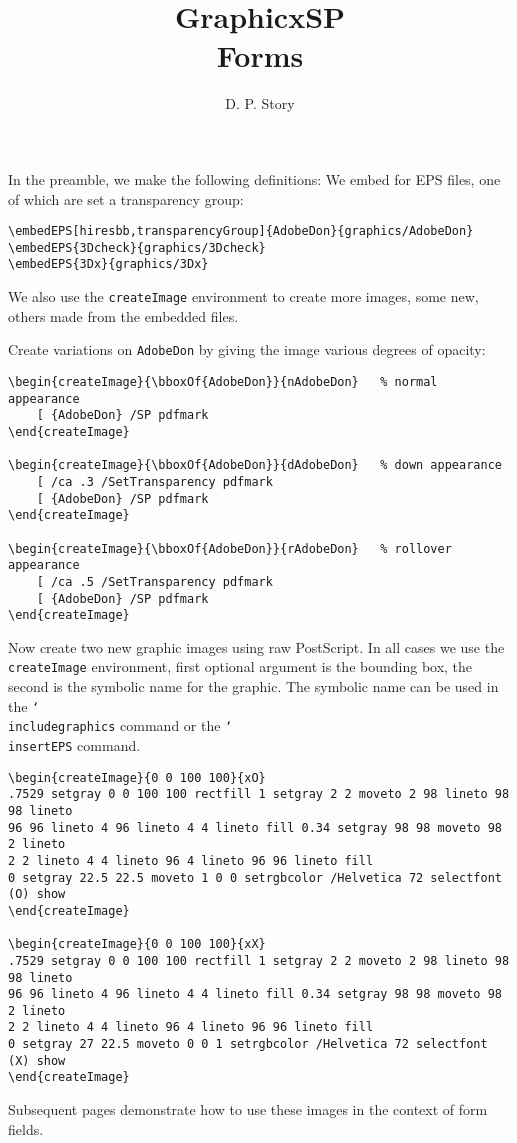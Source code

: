 \documentclass{article}
\title{\textsf{GraphicxSP}\texorpdfstring{\\}{:} Forms}
\author{D. P. Story}
\newcommand{\cs}[1]{\texttt{\char`\\#1}}
\begin{document}
\maketitle

In the preamble, we make the following definitions: We embed for EPS
files, one of which are set a transparency group:
{\small\begin{Verbatim}[fontsize=\small]
\embedEPS[hiresbb,transparencyGroup]{AdobeDon}{graphics/AdobeDon}
\embedEPS{3Dcheck}{graphics/3Dcheck}
\embedEPS{3Dx}{graphics/3Dx}
\end{Verbatim}
}
We also use the \texttt{createImage} environment to create more images, some new, others made
from the embedded files.\medskip

Create variations on \texttt{AdobeDon} by giving the image various degrees of opacity:
\begin{Verbatim}[fontsize=\scriptsize]
\begin{createImage}{\bboxOf{AdobeDon}}{nAdobeDon}   % normal appearance
    [ {AdobeDon} /SP pdfmark
\end{createImage}

\begin{createImage}{\bboxOf{AdobeDon}}{dAdobeDon}   % down appearance
    [ /ca .3 /SetTransparency pdfmark
    [ {AdobeDon} /SP pdfmark
\end{createImage}

\begin{createImage}{\bboxOf{AdobeDon}}{rAdobeDon}   % rollover appearance
    [ /ca .5 /SetTransparency pdfmark
    [ {AdobeDon} /SP pdfmark
\end{createImage}
\end{Verbatim}


\newpage

Now create two new graphic images using raw PostScript. In all cases we use
the \texttt{createImage} environment, first optional argument is the bounding box,
the second is the symbolic name for the graphic. The symbolic name can be used
in the \cs{includegraphics} command or the \cs{insertEPS} command.
\begin{Verbatim}[fontsize=\scriptsize]
\begin{createImage}{0 0 100 100}{xO}
.7529 setgray 0 0 100 100 rectfill 1 setgray 2 2 moveto 2 98 lineto 98 98 lineto
96 96 lineto 4 96 lineto 4 4 lineto fill 0.34 setgray 98 98 moveto 98 2 lineto
2 2 lineto 4 4 lineto 96 4 lineto 96 96 lineto fill
0 setgray 22.5 22.5 moveto 1 0 0 setrgbcolor /Helvetica 72 selectfont (O) show
\end{createImage}

\begin{createImage}{0 0 100 100}{xX}
.7529 setgray 0 0 100 100 rectfill 1 setgray 2 2 moveto 2 98 lineto 98 98 lineto
96 96 lineto 4 96 lineto 4 4 lineto fill 0.34 setgray 98 98 moveto 98 2 lineto
2 2 lineto 4 4 lineto 96 4 lineto 96 96 lineto fill
0 setgray 27 22.5 moveto 0 0 1 setrgbcolor /Helvetica 72 selectfont (X) show
\end{createImage}
\end{Verbatim}
Subsequent pages demonstrate how to use these images in the context of form fields.\medskip
\end{document}
